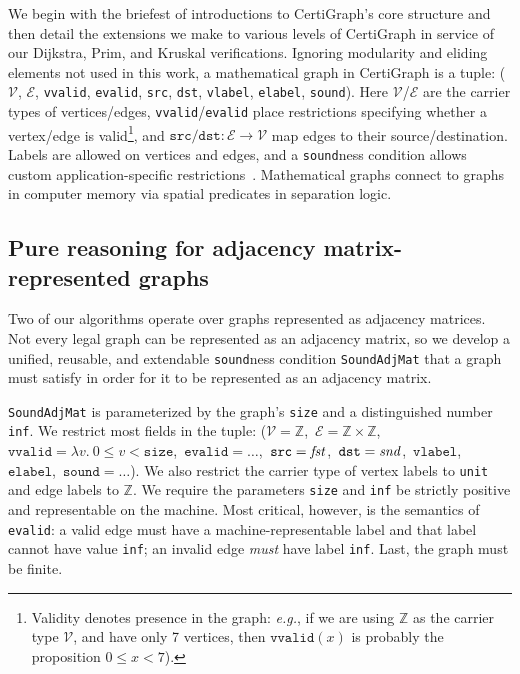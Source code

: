 We begin with the briefest of introductions to CertiGraph's core structure and then detail the extensions we make to various levels of
CertiGraph in service of our Dijkstra, Prim, and Kruskal verifications.
Ignoring modularity and eliding elements not used in this work,
a mathematical graph in CertiGraph is a tuple:
($\mathcal{V}$, $\mathcal{E}$, \texttt{vvalid}, \texttt{evalid},
\texttt{src}, \texttt{dst}, \texttt{vlabel}, \texttt{elabel},
\texttt{sound}). Here $\mathcal{V}$/$\mathcal{E}$ are the carrier
types of vertices/edges, \texttt{vvalid}/\texttt{evalid}
place restrictions specifying whether a vertex/edge is
valid\footnote{Validity denotes presence in the graph: \emph{e.g.}, if we are using $\mathbb{Z}$ as the carrier type $\mathcal{V}$, and have
only 7 vertices, then $\texttt{vvalid}(x)$ is probably the proposition $0 \le x < 7$).},
and $\texttt{src}/\texttt{dst} : \mathcal{E} \to \mathcal{V}$ map edges to their source/destination.
Labels are allowed on vertices and edges, and
a \texttt{sound}ness condition allows custom application-specific
restrictions~\cite{DBLP:journals/pacmpl/WangCMH19}.
Mathematical graphs connect to graphs in computer memory via spatial predicates in separation logic.

\vspace*{-0.25em}
\subsection{Pure reasoning for adjacency matrix-represented graphs}
\label{sec:adjmatpure}
\vspace*{-0.25em}

Two of our algorithms operate over graphs represented as adjacency matrices.
Not every legal graph can be represented as an adjacency matrix,
so we develop a unified, reusable, and extendable \texttt{sound}ness condition
\texttt{SoundAdjMat} that a graph must satisfy in order for it
to be represented as an adjacency matrix.

\texttt{SoundAdjMat} is parameterized by the graph's \texttt{size} and a distinguished number \texttt{inf}.
We restrict most fields in the tuple:
($\mathcal{V}=\mathbb{Z}$,\ $\mathcal{E}=\mathbb{Z} \times \mathbb{Z}$,\ $\texttt{vvalid}=\lambda v.~\mbox{$0 \le v < \texttt{size}$}$,\ $\texttt{evalid}=\ldots$,\ $\texttt{src}=\mathit{fst}$,\ $\texttt{dst}=\mathit{snd}$,\ $\texttt{vlabel}$,\ $\texttt{elabel}$,\ $\texttt{sound}=\ldots$).  We also restrict the carrier type of vertex labels to \texttt{unit} and edge labels to $\mathbb{Z}$.
We require the parameters \texttt{size} and \texttt{inf} be
strictly positive and representable on the machine.
Most critical, however, is the semantics of \texttt{evalid}:
a valid edge must have a machine-representable label and that label
cannot have value \texttt{inf}; an invalid edge \emph{must} have label \texttt{inf}.
Last, the graph must be finite.

